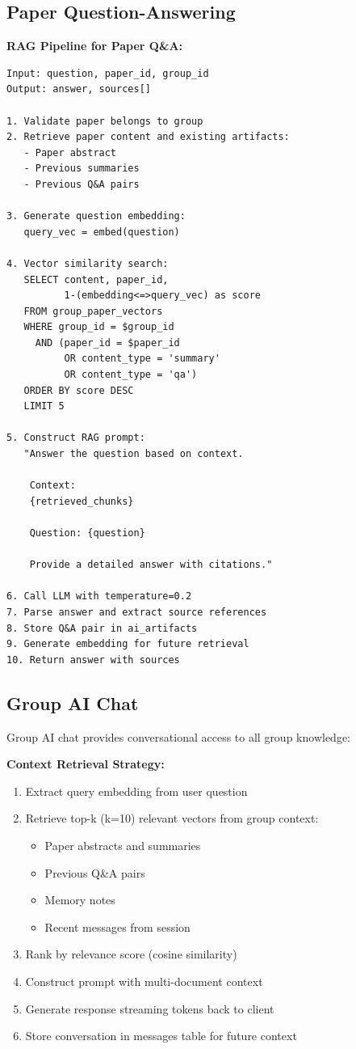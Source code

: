 \documentclass[12pt]{report}
\begin{document}
\subsection{Paper Question-Answering}

\textbf{RAG Pipeline for Paper Q\&A:}

\begin{verbatim}
Input: question, paper_id, group_id
Output: answer, sources[]

1. Validate paper belongs to group
2. Retrieve paper content and existing artifacts:
   - Paper abstract
   - Previous summaries
   - Previous Q&A pairs
   
3. Generate question embedding:
   query_vec = embed(question)
   
4. Vector similarity search:
   SELECT content, paper_id, 
          1-(embedding<=>query_vec) as score
   FROM group_paper_vectors
   WHERE group_id = $group_id
     AND (paper_id = $paper_id 
          OR content_type = 'summary'
          OR content_type = 'qa')
   ORDER BY score DESC
   LIMIT 5
   
5. Construct RAG prompt:
   "Answer the question based on context.
    
    Context:
    {retrieved_chunks}
    
    Question: {question}
    
    Provide a detailed answer with citations."
    
6. Call LLM with temperature=0.2
7. Parse answer and extract source references
8. Store Q&A pair in ai_artifacts
9. Generate embedding for future retrieval
10. Return answer with sources
\end{verbatim}

\subsection{Group AI Chat}

Group AI chat provides conversational access to all group knowledge:

\textbf{Context Retrieval Strategy:}

\begin{enumerate}
    \item Extract query embedding from user question
    \item Retrieve top-k (k=10) relevant vectors from group context:
    \begin{itemize}
        \item Paper abstracts and summaries
        \item Previous Q\&A pairs
        \item Memory notes
        \item Recent messages from session
    \end{itemize}
    \item Rank by relevance score (cosine similarity)
    \item Construct prompt with multi-document context
    \item Generate response streaming tokens back to client
    \item Store conversation in messages table for future context
\end{enumerate}
\end{document}

